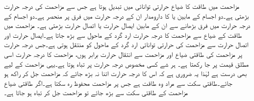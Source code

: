 مزاحمت میں طاقت کا ضیاع حرارتی توانائی میں تبدیل ہوتا ہے جس سے مزاحمت کی درجہ حرارت بڑھتی ہے۔دو اجسام  کے مابین  یا  کا دارومدار ان کے درجہ حرارت میں فرق پر منحصر ہے۔دو اجسام کے درجہ حرارت میں فرق بڑھانے سے ان کے مابین ایصال حرارت یا اتصال حرارت بڑھتی ہے۔  مزاحمت میں طاقت کے ضیاع سے مزاحمت کا درجہ حرارت ارد گرد کے ماحول  سے بڑھ جاتا ہے۔ایصال حرارت اور اتصال حرارت سے مزاحمت کی حرارتی توانائی ارد گرد کے ماحول کو منتقل ہوتی ہے۔جس درجہ حرارت پر مزاحمت کی طاقتی ضیاع اور مزاحمت سے انتقال حرارت برابر ہوں، مزاحمت کا درجہ حرارت اسی مطلق قیمت پر جا رکھتا ہے۔ ہر شے کسی مخصوص درجہ حرارت پر تباہ ہوتا ہے۔یہی مزاحمت کے لیے بھی درست ہے لہٰذا یہ ضروری ہے کہ اس کا درجہ حرارت اتنا نہ بڑھ جائے کہ مزاحمت جل کر راکھ ہو جائے۔طاقتی سکت سے مراد وہ طاقت ہے جس پر مزاحمت محفوظ رہ سکتا ہے۔اگر طاقتی ضیاع مزاحمت کے طاقتی سکت سے بڑھ جائے تو مزاحمت جل کر تباہ ہو جاتا ہے۔

